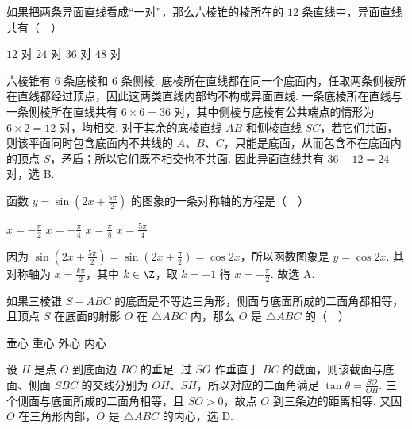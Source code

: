 \documentclass[UTF8,a4paper,oneside,11pt]{ctexbook}
\begin{document}
\begin{problem}
如果把两条异面直线看成“一对”，那么六棱锥的棱所在的 \(12\) 条直线中，异面直线共有（\(\quad\)）

\choices
    {\(12\) 对}
    {\(24\) 对}
    {\(36\) 对}
    {\(48\) 对}


\begin{solution}
六棱锥有 \(6\) 条底棱和 \(6\) 条侧棱. 底棱所在直线都在同一个底面内，任取两条侧棱所在直线都经过顶点，因此这两类直线内部均不构成异面直线. 一条底棱所在直线与一条侧棱所在直线共有 \(6\times6=36\) 对，其中侧棱与底棱有公共端点的情形为 \(6\times2=12\) 对，均相交. 对于其余的底棱直线 \(AB\) 和侧棱直线 \(SC\)，若它们共面，则该平面同时包含底面内不共线的 \(A\)、\(B\)、\(C\)，只能是底面，从而包含不在底面内的顶点 \(S\)，矛盾；所以它们既不相交也不共面. 因此异面直线共有 \(36-12=24\) 对，选 B.
\end{solution}
\end{problem}

\begin{problem}
函数 \(y=\sin\left(2x+\frac{5\pi}{2}\right)\) 的图象的一条对称轴的方程是（\(\quad\)）

\choices
    {\(x = -\frac{\pi}{2}\)}
    {\(x = -\frac{\pi}{4}\)}
    {\(x = \frac{\pi}{8}\)}
    {\(x = \frac{5\pi}{4}\)}


\begin{solution}
因为 \(\sin\left(2x+\frac{5\pi}{2}\right)=\sin\left(2x+\frac{\pi}{2}\right)=\cos2x\)，所以函数图象是 \(y=\cos2x\). 其对称轴为 \(x=\frac{k\pi}{2}\)，其中 \(k\in\Z\)，取 \(k=-1\) 得 \(x=-\frac{\pi}{2}\). 故选 A.
\end{solution}
\end{problem}

\begin{problem}
如果三棱锥 \(S-ABC\) 的底面是不等边三角形，侧面与底面所成的二面角都相等，且顶点 \(S\) 在底面的射影 \(O\) 在 \(\triangle ABC\) 内，那么 \(O\) 是 \(\triangle ABC\) 的（\(\quad\)）

\choices
    {垂心}
    {重心}
    {外心}
    {内心}


\begin{solution}
设 \(H\) 是点 \(O\) 到底面边 \(BC\) 的垂足. 过 \(SO\) 作垂直于 \(BC\) 的截面，则该截面与底面、侧面 \(SBC\) 的交线分别为 \(OH\)、\(SH\)，所以对应的二面角满足 \(\tan\theta=\frac{SO}{OH}\). 三个侧面与底面所成的二面角相等，且 \(SO>0\)，故点 \(O\) 到三条边的距离相等. 又因 \(O\) 在三角形内部，\(O\) 是 \(\triangle ABC\) 的内心，选 D.
\end{solution}
\end{problem}
\end{document}
